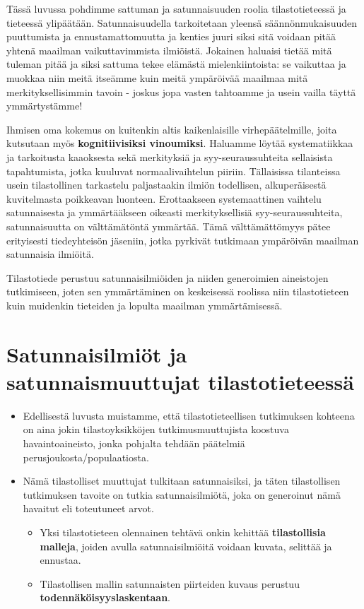 \documentclass[
]{book}
\providecommand{\tightlist}{%
  \setlength{\itemsep}{0pt}\setlength{\parskip}{0pt}}
\begin{document}
Tässä luvussa pohdimme sattuman ja satunnaisuuden roolia tilastotieteessä ja tieteessä ylipäätään. Satunnaisuudella tarkoitetaan yleensä säännönmukaisuuden puuttumista ja ennustamattomuutta ja kenties juuri siksi sitä voidaan pitää yhtenä maailman vaikuttavimmista ilmiöistä. Jokainen haluaisi tietää mitä tuleman pitää ja siksi sattuma tekee elämästä mielenkiintoista: se vaikuttaa ja muokkaa niin meitä itseämme kuin meitä ympäröivää maailmaa mitä merkityksellisimmin tavoin - joskus jopa vasten tahtoamme ja usein vailla täyttä ymmärtystämme!

Ihmisen oma kokemus on kuitenkin altis kaikenlaisille virhepäätelmille, joita kutsutaan myös \textbf{kognitiivisiksi vinoumiksi}. Haluamme löytää systematiikkaa ja tarkoitusta kaaoksesta sekä merkityksiä ja syy-seuraussuhteita sellaisista tapahtumista, jotka kuuluvat normaalivaihtelun piiriin. Tällaisissa tilanteissa usein tilastollinen tarkastelu paljastaakin ilmiön todellisen, alkuperäisestä kuvitelmasta poikkeavan luonteen. Erottaakseen systemaattinen vaihtelu satunnaisesta ja ymmärtääkseen oikeasti merkityksellisiä syy-seuraussuhteita, satunnaisuutta on välttämätöntä ymmärtää. Tämä välttämättömyys pätee erityisesti tiedeyhteisön jäseniin, jotka pyrkivät tutkimaan ympäröivän maailman satunnaisia ilmiöitä.

Tilastotiede perustuu satunnaisilmiöiden ja niiden generoimien aineistojen tutkimiseen, joten sen ymmärtäminen on keskeisessä roolissa niin tilastotieteen kuin muidenkin tieteiden ja lopulta maailman ymmärtämisessä.

\hypertarget{alaluku41}{%
\section{Satunnaisilmiöt ja satunnaismuuttujat tilastotieteessä}\label{alaluku41}}

\begin{itemize}
\tightlist
\item
  Edellisestä luvusta muistamme, että tilastotieteellisen tutkimuksen kohteena on aina jokin tilastoyksikköjen tutkimusmuuttujista koostuva havaintoaineisto, jonka pohjalta tehdään päätelmiä perusjoukosta/populaatiosta.
\item
  Nämä tilastolliset muuttujat tulkitaan satunnaisiksi, ja täten tilastollisen tutkimuksen tavoite on tutkia satunnaisilmiötä, joka on generoinut nämä havaitut eli toteutuneet arvot.

  \begin{itemize}
  \tightlist
  \item
    Yksi tilastotieteen olennainen tehtävä onkin kehittää \textbf{tilastollisia malleja}, joiden avulla satunnaisilmiöitä voidaan kuvata, selittää ja ennustaa.
  \item
    Tilastollisen mallin satunnaisten piirteiden kuvaus perustuu \textbf{todennäköisyyslaskentaan}.
  \end{itemize}
\end{itemize}
\end{document}
